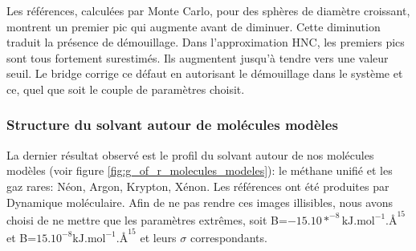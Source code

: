 Les références, calculées par Monte Carlo, pour des sphères de diamètre croissant, montrent un premier pic qui augmente avant de diminuer. Cette diminution traduit la présence de démouillage. Dans l'approximation HNC, les premiers pics sont tous fortement surestimés. Ils augmentent jusqu'à tendre vers une valeur seuil. Le bridge corrige ce défaut en autorisant le démouillage dans le système et ce, quel que soit le couple de paramètres choisit. 




\subsubsection{ Structure du solvant autour de molécules modèles}
La dernier résultat observé est le profil du solvant autour de nos molécules modèles (voir figure \ref{fig:g_of_r_molecules_modeles}): le méthane unifié et les gaz rares: Néon, Argon, Krypton, Xénon. Les références ont été produites par Dynamique moléculaire. Afin de ne pas rendre ces images illisibles, nous avons choisi de ne mettre que les paramètres extrêmes, soit B=$-15.10*^{-8} \mathrm{kJ.mol}^{-1}.\text{\AA}^{15}$ et B=$15.10^{-8} \mathrm{kJ.mol}^{-1}.\text{\AA}^{15}$ et leurs $\sigma$ correspondants.




